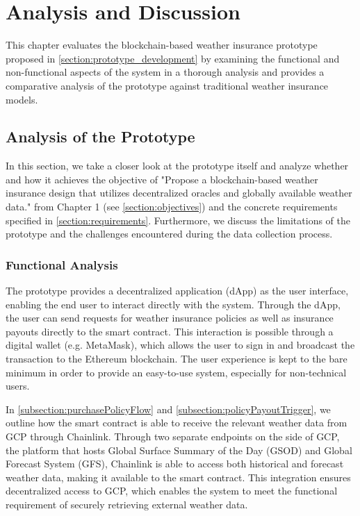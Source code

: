 \chapter{Analysis and Discussion}\label{chapter:analysis_discussion}
This chapter evaluates the blockchain-based weather insurance prototype proposed in \cref{section:prototype_development} by examining the functional and non-functional aspects of the system in a thorough analysis and provides a comparative analysis of the prototype against traditional weather insurance models.

\section{Analysis of the Prototype}
In this section, we take a closer look at the prototype itself and analyze whether and how it achieves the objective of "Propose a blockchain-based weather insurance design that utilizes decentralized oracles and globally available weather data." from Chapter 1 (see \cref{section:objectives}) and the concrete requirements specified in \cref{section:requirements}. Furthermore, we discuss the limitations of the prototype and the challenges encountered during the data collection process.

\subsection{Functional Analysis}
The prototype provides a decentralized application (dApp) as the user interface, enabling the end user to interact directly with the system. Through the dApp, the user can send requests for weather insurance policies as well as insurance payouts directly to the smart contract. This interaction is possible through a digital wallet (e.g. MetaMask), which allows the user to sign in and broadcast the transaction to the Ethereum blockchain. The user experience is kept to the bare minimum in order to provide an easy-to-use system, especially for non-technical users.

In \cref{subsection:purchasePolicyFlow} and \cref{subsection:policyPayoutTrigger}, we outline how the smart contract is able to receive the relevant weather data from GCP through Chainlink. Through two separate endpoints on the side of GCP, the platform that hosts Global Surface Summary of the Day (GSOD) and Global Forecast System (GFS), Chainlink is able to access both historical and forecast weather data, making it available to the smart contract. This integration ensures decentralized access to GCP, which enables the system to meet the functional requirement of securely retrieving external weather data.

